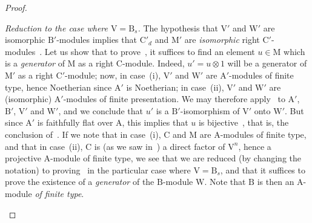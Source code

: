 \begin{proof}
\begin{env}[2.5.8.7]
\label{IV.2.5.8.7}
\emph{Reduction to the case where $\mathrm{V}=\mathrm{B}_s$.}
The hypothesis that $\mathrm{V}'$ and $\mathrm{W}'$ are isomorphic
$\mathrm{B}'$-modules implies that $\mathrm{C}'_d$ and $\mathrm{M}'$
are \emph{isomorphic} right $\mathrm{C}'$-modules~. Let us
show that to prove~, it suffices to find an element
$u\in\mathrm{M}$ which is a \emph{generator} of $\mathrm{M}$ as a right
$\mathrm{C}$-module. Indeed, $u'=u\otimes1$ will be a generator of
$\mathrm{M}'$ as a right $\mathrm{C}'$-module; now, in case~(i),
$\mathrm{V}'$ and $\mathrm{W}'$ are $\mathrm{A}'$-modules of finite type,
hence Noetherian since $\mathrm{A}'$ is Noetherian; in case~(ii),
$\mathrm{V}'$ and $\mathrm{W}'$ are \textnormal{(}isomorphic\textnormal{)}
$\mathrm{A}'$-modules of finite presentation. We may therefore
apply~ to $\mathrm{A}'$, $\mathrm{B}'$, $\mathrm{V}'$ and
$\mathrm{W}'$, and we conclude that $u'$ is a $\mathrm{B}'$-isomorphism of
$\mathrm{V}'$ onto $\mathrm{W}'$. But since $\mathrm{A}'$ is faithfully
flat over $\mathrm{A}$, this implies that $u$ is
bijective~, that is, the
conclusion of~. If we note that in case~(i), $\mathrm{C}$
and $\mathrm{M}$ are $\mathrm{A}$-modules of finite type, and that in
case~(ii), $\mathrm{C}$ is \textnormal{(}as we saw
in~\textnormal{)} a direct factor of $\mathrm{V}^n$, hence
a projective $\mathrm{A}$-module of finite type, we see that we are reduced
\textnormal{(}by changing the notation\textnormal{)} to proving~
in the particular case where $\mathrm{V}=\mathrm{B}_s$, and that it suffices
to prove the existence of a \emph{generator} of the $\mathrm{B}$-module
$\mathrm{W}$. Note that $\mathrm{B}$ is then an $\mathrm{A}$-module
\emph{of finite type}.
\end{env}


\end{proof}
